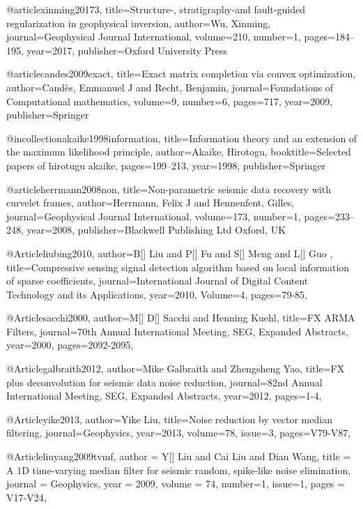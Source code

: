 @article{xinming20173,
  title={Structure-, stratigraphy-and fault-guided regularization in geophysical inversion},
  author={Wu, Xinming},
  journal={Geophysical Journal International},
  volume={210},
  number={1},
  pages={184--195},
  year={2017},
  publisher={Oxford University Press}
}

@article{candes2009exact,
  title={Exact matrix completion via convex optimization},
  author={Cand{\`e}s, Emmanuel J and Recht, Benjamin},
  journal={Foundations of Computational mathematics},
  volume={9},
  number={6},
  pages={717},
  year={2009},
  publisher={Springer}
}

@incollection{akaike1998information,
  title={Information theory and an extension of the maximum likelihood principle},
  author={Akaike, Hirotogu},
  booktitle={Selected papers of hirotugu akaike},
  pages={199--213},
  year={1998},
  publisher={Springer}
}

@article{herrmann2008non,
  title={Non-parametric seismic data recovery with curvelet frames},
  author={Herrmann, Felix J and Hennenfent, Gilles},
  journal={Geophysical Journal International},
  volume={173},
  number={1},
  pages={233--248},
  year={2008},
  publisher={Blackwell Publishing Ltd Oxford, UK}
}

@Article{liubing2010,
  author={B[] Liu and P[] Fu and S[] Meng and L[] Guo },
  title={Compressive sensing signal detection algorithm based on local information of sparse coefficients},
  journal={International Journal of Digital Content Technology and its Applications},
  year=2010,
  Volume=4,
  pages={79-85},
}


@Article{sacchi2000,
  author={M[] D[] Sacchi and Henning Kuehl},
  title={FX ARMA Filters},
  journal={70th Annual International Meeting, SEG, Expanded Abstracts},
  year=2000,
  pages={2092-2095},
}

@Article{galbraith2012,
  author={Mike Galbraith and Zhengsheng Yao},
  title={FX plus deconvolution for seismic data noise reduction},
  journal={82nd Annual International Meeting, SEG, Expanded Abstracts},
  year=2012,
  pages={1-4},
}

@Article{yike2013,
  author={Yike Liu},
  title={Noise reduction by vector median filtering},
  journal={Geophysics},
  year=2013,
  volume=78,
  issue=3,
  pages={V79-V87},
}

@Article{liuyang2009tvmf,
  author = 	 {Y[] Liu and Cai Liu and Dian Wang},
  title = 	 {A {1D} time-varying median filter for seismic random, spike-like noise elimination},
  journal = 	 {Geophysics},
  year = 	 2009,
  volume =	 74,
  number=1,
  issue=1,
  pages =	 {V17-V24},
}

